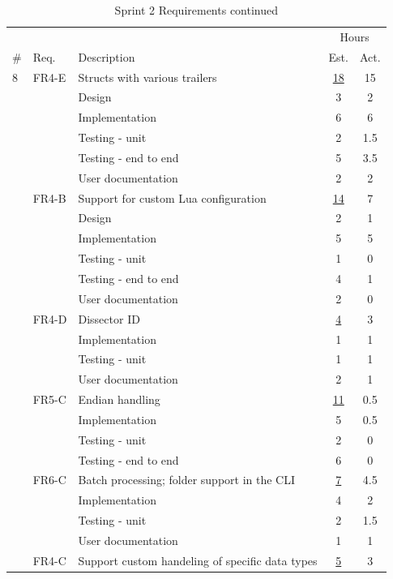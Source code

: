 \begin{table}[!htb] \small \center
\caption{Sprint 2 Requirements continued\label{tab:sprint2req2}}
\begin{tabularx}{\textwidth}{l l X c c}
	\toprule
	& & & \multicolumn{2}{c}{Hours} \\
	\cmidrule(r){4-5}
	\# & Req. & Description & Est. & Act. \\
	\midrule
	8 & FR4-E & Structs with various trailers & \underline{ 18 } & 15 \\
	   &  & Design & 3 & 2 \\
	   &  & Implementation & 6 & 6 \\
	   &  & Testing - unit & 2 & 1.5 \\
	   &  & Testing - end to end & 5 & 3.5 \\
	   &  & User documentation & 2 & 2 \\
	\addlinespace
	9 & FR4-B & Support for custom Lua configuration & \underline{ 14 } & 7 \\
	   &  & Design & 2 & 1 \\
	   &  & Implementation & 5 & 5 \\
	   &  & Testing - unit & 1 & 0 \\
	   &  & Testing - end to end & 4 & 1 \\
	   &  & User documentation & 2 & 0 \\
	\addlinespace
	10 & FR4-D & Dissector ID & \underline{ 4 } & 3 \\
	   &  & Implementation & 1 & 1 \\
	   &  & Testing - unit & 1 & 1 \\
	   &  & User documentation & 2 & 1 \\
	\addlinespace
	11 & FR5-C & Endian handling & \underline{ 11 } & 0.5 \\
	   &  & Implementation & 5 & 0.5 \\
	   &  & Testing - unit & 2 & 0 \\
	   &  & Testing - end to end & 6 & 0 \\
	\addlinespace
	12 & FR6-C & Batch processing; folder support in the CLI & \underline{ 7 } & 4.5 \\
	   &  & Implementation & 4 & 2 \\
	   &  & Testing - unit & 2 & 1.5 \\
	   &  & User documentation & 1 & 1 \\
	\addlinespace
	13 & FR4-C & Support custom handeling of specific data types & \underline{ 5 } & 3 \\

\end{tabularx}
\end{table}
